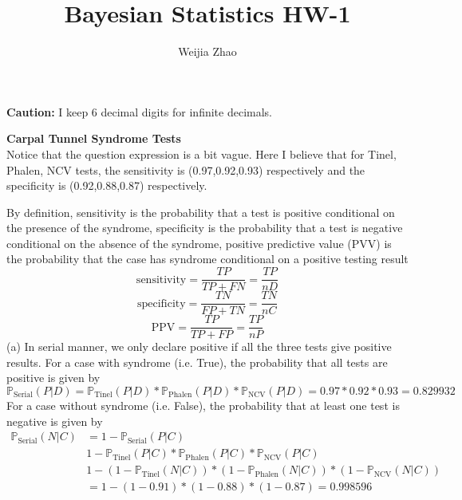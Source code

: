 \documentclass{homeworg}
\title{Bayesian Statistics HW-1}
\author{Weijia Zhao}
\begin{document}
\maketitle

\textbf{Caution:} I keep 6 decimal digits for infinite decimals.

\exercise 
\textbf{Carpal Tunnel Syndrome Tests} \\
Notice that the question expression is a bit vague. Here I believe that for Tinel, Phalen, NCV tests, the sensitivity is (0.97,0.92,0.93) respectively and the specificity is (0.92,0.88,0.87) respectively. \vspace{0.2em}

By definition, sensitivity is the probability that a test is positive conditional on the presence of the syndrome, specificity is the probability that a test is negative conditional on the absence of the syndrome, positive predictive value (PVV) is the probability that the case has syndrome conditional on a positive testing result
\begin{equation*}
\text{sensitivity}=\frac{TP}{TP+FN}=\frac{TP}{nD}
\end{equation*}
\begin{equation*}
\text{specificity}=\frac{TN}{FP+TN}=\frac{TN}{nC}
\end{equation*}
\begin{equation*}
\text{PPV}=\frac{TP}{TP+FP}=\frac{TP}{nP}
\end{equation*}
(a) In serial manner, we only declare positive if all the three tests give positive results. For a case with syndrome (i.e. True), the probability that all tests are positive is given by 
\begin{equation*}
\mathbb{P}_{\text{Serial}}(P|D)=\mathbb{P}_{\text{Tinel}}(P|D)*\mathbb{P}_{\text{Phalen}}(P|D)*\mathbb{P}_{\text{NCV}}(P|D)=0.97*0.92*0.93=0.829932
\end{equation*}
For a case without syndrome (i.e. False), the probability that at least one test is negative is given by 
\begin{align*}
\mathbb{P}_{\text{Serial}}(N|C)&=1-\mathbb{P}_{\text{Serial}}(P|C)\\
&1-\mathbb{P}_{\text{Tinel}}(P|C)*\mathbb{P}_{\text{Phalen}}(P|C)*\mathbb{P}_{\text{NCV}}(P|C)\\
&1-(1-\mathbb{P}_{\text{Tinel}}(N|C))*(1-\mathbb{P}_{\text{Phalen}}(N|C))*(1-\mathbb{P}_{\text{NCV}}(N|C))\\
&=1-(1-0.91)*(1-0.88)*(1-0.87)=0.998596
\end{align*}
\end{document}
